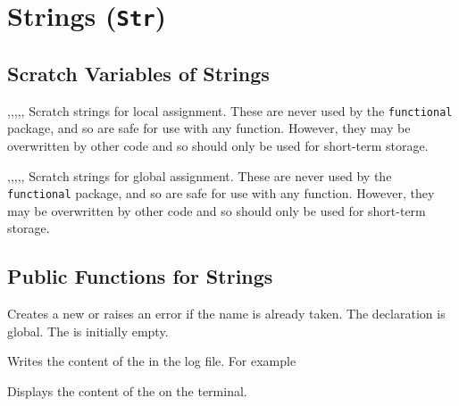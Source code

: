 \documentclass[oneside]{book}
\begin{document}
\chapter{Strings (\texttt{Str})}

\section{Scratch Variables of Strings}

\begin{variable}{\lTmpaStr,\lTmpbStr,\lTmpcStr,\lTmpiStr,\lTmpjStr,\lTmpkStr}
Scratch strings for local assignment. These are never used by
the \verb!functional! package, and so are safe for use with any
function. However, they may be overwritten by other
code and so should only be used for short-term storage.
\end{variable}

\begin{variable}{\gTmpaStr,\gTmpbStr,\gTmpcStr,\gTmpiStr,\gTmpjStr,\gTmpkStr}
Scratch strings for global assignment. These are never used by
the \verb!functional! package, and so are safe for use with any
function. However, they may be overwritten by other
code and so should only be used for short-term storage.
\end{variable}

\section{Public Functions for Strings}

\begin{function}{\StrNew}
\begin{syntax}
 
\end{syntax}
Creates a new  or raises an error if the name is
already taken. The declaration is global. The  is
initially empty.
\end{function}

\begin{function}{\StrLogVar}
\begin{syntax}
 
\end{syntax}
Writes the content of the  in the log file.
For example
\begin{codehigh}
\StrSet{}
\StrLogVar\lTmpiStr
\end{codehigh}
\end{function}

\begin{function}{\StrShowVar}
\begin{syntax}
 
\end{syntax}
Displays the content of the  on the terminal.
\end{function}
\end{document}

